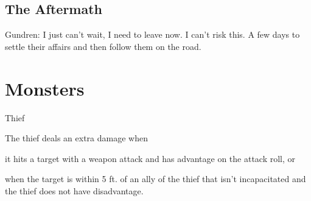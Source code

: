 \documentclass[10pt,twocolumn,openany,nodeprecatedcode,bg=none,inline]{dndbook}
\begin{document}
\section{The Aftermath}
Gundren: I just can't wait, I need to leave now. I can't risk this.
A few days to settle their affairs and then follow them on the road.

\appendix
\chapter{Monsters}

\begin{DndMonster}{Thief}
  \DndMonsterBasics[
    armor-class=13,
    hit-points=\DndDice{4d8},
    speed={30 ft., climb 30ft.}
  ]
  \DndMonsterAbilityScores[str=8, dex=14, con=10, int=10, wis=12, cha=12]
  \DndMonsterDetails[
    skills={Stealth +6},
    senses={passive Perception 11},
    languages={Common, Thieves' Cant},
    challenge={1/4}
  ]
  
  The thief deals an extra  damage when 
  \begin{enumerate*}[label={(\arabic*)}]
    \item it hits a target with a weapon attack and has advantage on the attack roll, or
    \item when the target is within 5 ft. of an ally of the thief that isn't incapacitated and the thief does not have disadvantage.
  \end{enumerate*}

  \DndMonsterMelee[
    name=Mace,
    mod=+0,
    reach=5,
    targets=one target,
    dmg=\DndDice{1d6-1},
    dmg-type=bludgeoning
  ]
  \end{DndMonster}
\end{document}

